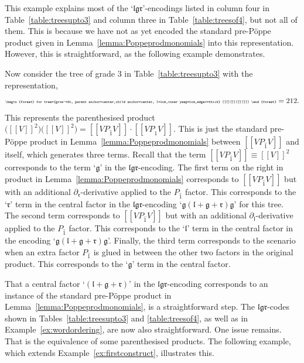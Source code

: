 \documentclass[5p,twocolumn]{elsarticle}
\newcommand*{\pa}{{\partial}}
\newcommand*{\lb}{[\![}
\newcommand*{\rb}{]\!]}
\newcommand*{\el}{\mathfrak l}
\newcommand*{\gl}{\mathfrak g}
\newcommand*{\rl}{\mathfrak r}
\begin{document}
%
This example explains most of the `$\el\gl\rl$'-encodings listed in column four in Table~\ref{table:treesupto3} and column three in Table~\ref{table:treesof4}, but not all of them.
This is because we have not as yet encoded the standard pre-P\"oppe product given in Lemma~\ref{lemma:Poppeprodmonomials} into this representation.
However, this is straightforward, as the following example demonstrates.
%
\begin{example}
  Now consider the tree of grade $3$ in Table~\ref{table:treesupto3} with the representation,
  \begin{equation*}
   {\tiny \begin{forest} for tree={grow'=90, parent anchor=center,child anchor=center, l=0cm,inner ysep=0cm,edge+=thick} [[[][]][[][]]] \end{forest}} =212.
  \end{equation*}
  This represents the parenthesised product $\bigl(\lb V\rb^2\bigr)\bigl(\lb V\rb^2\bigr)=\lb VP_{\hat 1}V\rb\cdot\lb VP_{\hat 1}V\rb$.
  This is just the standard pre-P\"oppe product in Lemma~\ref{lemma:Poppeprodmonomials} between $\lb VP_{\hat 1}V\rb$ and itself, which generates three terms.
  Recall that the term $\lb VP_{\hat 1}V\rb\equiv \lb V\rb^2$ corresponds to the term `$\gl$' in the $\el\gl\rl$-encoding. 
  The first term on the right in product in Lemma~\ref{lemma:Poppeprodmonomials} corresponds to $\lb VP_{\hat 1}V\rb$ but with an additional $\pa_{\rl}$-derivative applied to the $P_{\hat 1}$ factor.
  This corresponds to the `$\rl$' term in the central factor in the $\el\gl\rl$-encoding `$\gl(\el+\gl+\rl)\gl$' for this tree.
  The second term corresponds to $\lb VP_{\hat 1}V\rb$ but with an additional $\pa_{\el}$-derivative applied to the $P_{\hat 1}$ factor.
  This corresponds to the `$\el$' term in the central factor in the encoding `$\gl(\el+\gl+\rl)\gl$'.
  Finally, the third term corresponds to the scenario when an extra factor $P_{\hat 1}$ is glued in between the other two factors in the original product.
  This corresponds to the `$\gl$' term in the central factor.
\end{example}
%
That a central factor `$(\el+\gl+\rl)$' in the $\el\gl\rl$-encoding corresponds to an instance of the standard pre-P\"oppe product in Lemma~\ref{lemma:Poppeprodmonomials}, is a straightforward step.
The $\el\gl\rl$-codes shown in Tables~\ref{table:treesupto3} and \ref{table:treesof4}, as well as in Example~\ref{ex:wordordering}, are now also straightforward.
One issue remains. That is the equivalence of some parenthesised products. The following example, which extends Example~\ref{ex:firstconstruct}, illustrates this.
\end{document}
